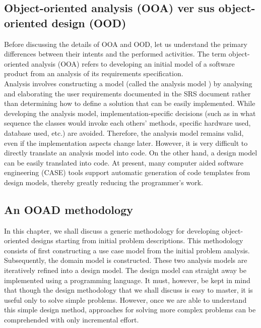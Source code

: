 \documentclass[12pt]{article}
\begin{document}
\subsection{Object-oriented analysis (OOA) ver sus object-oriented
design (OOD)}
Before discussing the details of OOA and OOD, let us understand the
primary differences between their intents and the performed activities.
The term object-oriented analysis (OOA) refers to developing an initial
model of a software product from an analysis of its requirements
specification.\\

Analysis involves constructing a model (called the analysis model ) by
analysing and elaborating the user requirements documented in the SRS
document rather than determining how to define a solution that can be easily
implemented. While developing the analysis model, implementation-specific
decisions (such as in what sequence the classes would invoke each others’
methods, specific hardware used, database used, etc.) are avoided.
Therefore, the analysis model remains valid, even if the implementation
aspects change later. However, it is very difficult to directly translate an
analysis model into code. On the other hand, a design model can be easily
translated into code. At present, many computer aided software engineering
(CASE) tools support automatic generation of code templates from design
models, thereby greatly reducing the programmer’s work.

\subsection{An OOAD methodology}
In this chapter, we shall discuss a generic methodology for developing
object-oriented designs starting from initial problem descriptions. This
methodology consists of first constructing a use case model from the
initial problem analysis. Subsequently, the domain model is constructed.
These two analysis models are iteratively refined into a design model.
The design model can straight away be implemented using a
programming language. It must, however, be kept in mind that though
the design methodology that we shall discuss is easy to master, it is
useful only to solve simple problems. However, once we are able to
understand this simple design method, approaches for solving more
complex problems can be comprehended with only incremental effort.
\pagebreak
\end{document}
